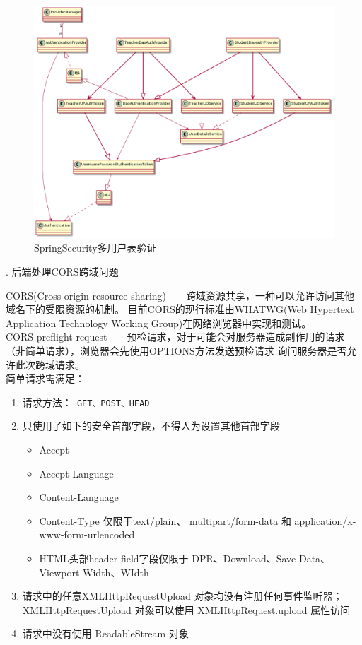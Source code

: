 \begin{figure}[htbp]
  \centering
  \includegraphics[scale = 0.35]{out/uml/类图/Spring Security/SpringSecurity多用户表验证/SpringSecurity多用户表验证.png}
  \caption{\song\wuhao SpringSecurity多用户表验证}
  \label{SpringSecurityMultiUser}
\end{figure}

. 后端处理CORS跨域问题

CORS(Cross-origin resource sharing)——跨域资源共享，一种可以允许访问其他域名下的受限资源的机制。
目前CORS的现行标准由WHATWG(Web Hypertext Application Technology Working Group)在网络浏览器中实现和测试。\\
CORS-preflight request——预检请求，对于可能会对服务器造成副作用的请求（非简单请求），浏览器会先使用OPTIONS方法发送预检请求
询问服务器是否允许此次跨域请求。\\
简单请求需满足：
\begin{enumerate}
  \item 请求方法：\lstinline[language = xml]| GET、POST、HEAD |
  \item 只使用了如下的安全首部字段，不得人为设置其他首部字段
        \begin{itemize}
          \item Accept
          \item Accept-Language
          \item Content-Language
          \item Content-Type 仅限于text/plain、 multipart/form-data 和 application/x-www-form-urlencoded
          \item HTML头部header field字段仅限于 DPR、Download、Save-Data、Viewport-Width、WIdth
        \end{itemize}
  \item 请求中的任意XMLHttpRequestUpload 对象均没有注册任何事件监听器；XMLHttpRequestUpload 对象可以使用 XMLHttpRequest.upload 属性访问
  \item 请求中没有使用 ReadableStream 对象
\end{enumerate}

